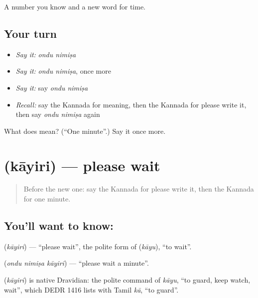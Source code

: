 \begin{grammarlens}[title={What you've built}]
A number you know and a new word for time.
\end{grammarlens}

\subsection*{Your turn}
\begin{itemize}
\raggedright
  \item \emph{Say it:} \emph{ondu nimiṣa}
  \item \emph{Say it:} \emph{ondu nimiṣa}, once more
  \item \emph{Say it:} say \emph{ondu nimiṣa}
  \item \emph{Recall:} say the Kannada for meaning, then the Kannada for please write it, then say \emph{ondu nimiṣa} again
\end{itemize}

\begin{tcolorbox}[breakable,colback=teal!4,colframe=teal!35!black,title={Before you move on}]
What does   mean? (\textquotedblleft{}One minute\textquotedblright{}.) Say it once more.
\end{tcolorbox}
\section[\texorpdfstring{\kn{ಕಾಯಿರಿ} (kāyiri)}{ಕಾಯಿರಿ (kāyiri)}]{ (kāyiri) — please wait}

\label{lesson:KA-C86-wait}



\begin{quote}
Before the new one: say the Kannada for please write it, then the Kannada for one minute.
\end{quote}

\subsection*{You'll want to know: }
\textbf{} (\emph{kāyiri}) — \textquotedblleft{}please wait\textquotedblright{}, the polite form of \textbf{} (\emph{kāyu}), \textquotedblleft{}to wait\textquotedblright{}.

\textbf{  } (\emph{ondu nimiṣa kāyiri}) — \textquotedblleft{}please wait a minute\textquotedblright{}.

\begin{cousinweb}
\textbf{} (\emph{kāyiri}) is native Dravidian: the polite command of \emph{kāyu}, \textquotedblleft{}to guard, keep watch, wait\textquotedblright{}, which DEDR 1416 lists with Tamil \emph{kā}, \textquotedblleft{}to guard\textquotedblright{}.
\end{cousinweb}

